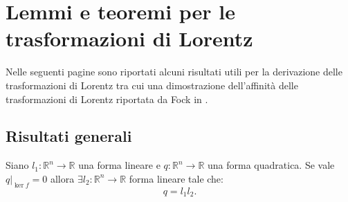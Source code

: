 \chapter{Lemmi e teoremi per le trasformazioni di Lorentz}
\label{chap:LinearitàLorentz}
 Nelle seguenti pagine sono riportati alcuni risultati utili per la derivazione delle trasformazioni di Lorentz tra cui una dimostrazione dell'affinità delle trasformazioni di Lorentz riportata da Fock in \cite{Fock}.\\

\section{Risultati generali}


\begin{lemma}
    Siano $l_1: \mathbb{R}^n\rightarrow\mathbb{R}$ una forma lineare e $q:\mathbb{R}^n\rightarrow\mathbb{R}$ una forma quadratica. Se vale $q|_{\ker f}=0$ allora $\exists l_2: \mathbb{R}^n\rightarrow\mathbb{R}$ forma lineare tale che:
    \begin{equation*}
        q=l_1l_2.
    \end{equation*}\label{lemm:A1}
\end{lemma}
